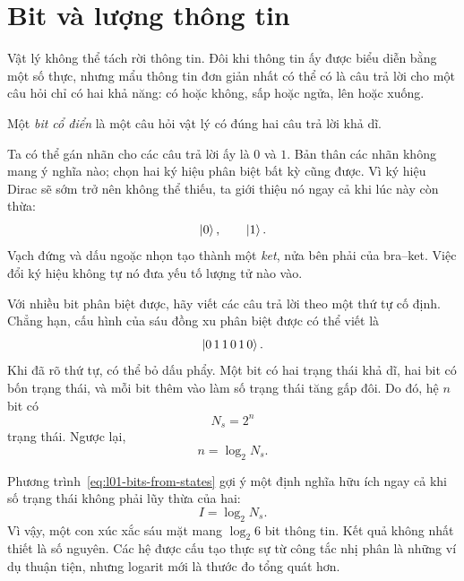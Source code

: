 \section{Bit và lượng thông tin}

Vật lý không thể tách rời thông tin. Đôi khi thông tin ấy được biểu diễn bằng một số thực, nhưng mẩu thông tin đơn giản nhất có thể có là câu trả lời cho một câu hỏi chỉ có hai khả năng: có hoặc không, sấp hoặc ngửa, lên hoặc xuống.

\begin{definition}Một \emph{bit cổ điển} là một câu hỏi vật lý có đúng hai câu trả lời khả dĩ.\end{definition}

Ta có thể gán nhãn cho các câu trả lời ấy là \(0\) và \(1\). Bản thân các nhãn không mang ý nghĩa nào; chọn hai ký hiệu phân biệt bất kỳ cũng được. Vì ký hiệu Dirac sẽ sớm trở nên không thể thiếu, ta giới thiệu nó ngay cả khi lúc này còn thừa:
\begin{equation}
  \left\lvert0\right\rangle,
  \qquad
  \left\lvert1\right\rangle.
\end{equation}
Vạch đứng và dấu ngoặc nhọn tạo thành một \emph{ket}, nửa bên phải của bra--ket. Việc đổi ký hiệu không tự nó đưa yếu tố lượng tử nào vào.

Với nhiều bit phân biệt được, hãy viết các câu trả lời theo một thứ tự cố định. Chẳng hạn, cấu hình của sáu đồng xu phân biệt được có thể viết là
\begin{equation}
  \left\lvert0\,1\,1\,0\,1\,0\right\rangle.
\end{equation}
Khi đã rõ thứ tự, có thể bỏ dấu phẩy. Một bit có hai trạng thái khả dĩ, hai bit có bốn trạng thái, và mỗi bit thêm vào làm số trạng thái tăng gấp đôi. Do đó, hệ \(n\) bit có
\begin{equation}
  N_s=2^n
  \label{eq:l01-state-count}
\end{equation}
trạng thái. Ngược lại,
\begin{equation}
  n=\log_2 N_s.
  \label{eq:l01-bits-from-states}
\end{equation}

Phương trình~\eqref{eq:l01-bits-from-states} gợi ý một định nghĩa hữu ích ngay cả khi số trạng thái không phải lũy thừa của hai:
\begin{equation}
  I=\log_2 N_s.
  \label{eq:l01-information}
\end{equation}
Vì vậy, một con xúc xắc sáu mặt mang \(\log_2 6\) bit thông tin. Kết quả không nhất thiết là số nguyên. Các hệ được cấu tạo thực sự từ công tắc nhị phân là những ví dụ thuận tiện, nhưng logarit mới là thước đo tổng quát hơn.

